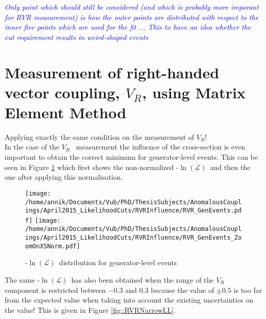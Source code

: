 \documentclass[a4paper,10pt]{article}
\newcommand{\NegLL}{-$\ln(\mathcal{L})$~}
\newcommand{\VR}{$V_{R}$}
\begin{document}

\textit{\textcolor{blue}{Only point which should still be considered (and which is probably more imporant for RVR measurement) is how the outer points are distributed with respect to the inner five points which are used for the fit ... This to have an idea whether the cut requirement results in weird-shaped events }}

\section[Measurement of \VR~ using MEM]{Measurement of right-handed vector coupling, \VR, using Matrix Element Method}
Applying exactly the same condition on the measurement of \VR!\\

In the case of the \VR~ measurement the influence of the cross-section is even important to obtain the correct minimum for generator-level events. This can be seen in Figure \ref{fig::RVRXSNeeded} which first shows the non-normalized \NegLL and then the one after applying this normalisation.

\begin{figure}[h!t]
 \caption{\NegLL distribution for generator-level events} \label{fig::RVRXSNeeded}
 \centering
 \texttt{[image: /home/annik/Documents/Vub/PhD/ThesisSubjects/AnomalousCouplings/April2015\_LikelihoodCuts/RVRInfluence/RVR\_GenEvents.pdf]}
 \texttt{[image: /home/annik/Documents/Vub/PhD/ThesisSubjects/AnomalousCouplings/April2015\_LikelihoodCuts/RVRInfluence/RVR\_GenEvents\_ZoomOnXSNorm.pdf]}
\end{figure}

The same \NegLL has also been obtained when the range of the \VR~ component is restricted between $-0.3$ and $0.3$ because the value of $\pm 0.5$ is too far from the expected value when taking into account the existing uncertainties on the value! This is given in Figure \ref{fig::RVRNarrowLL}.\\
\end{document}
